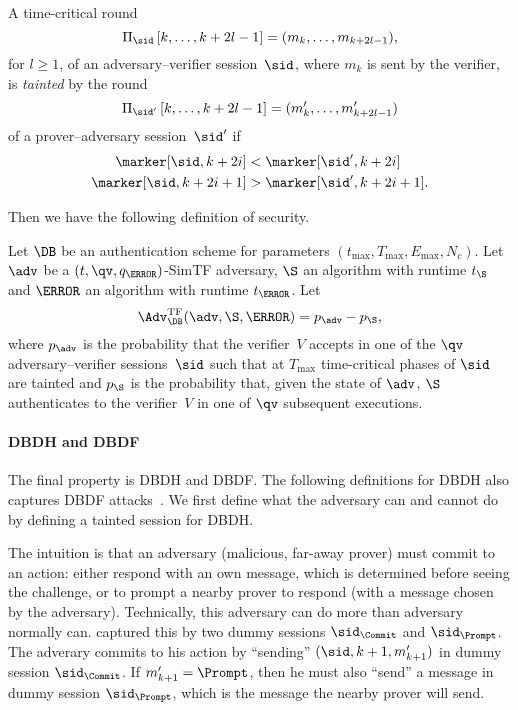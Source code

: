 \begin{definition}\label{TaintedTF}
  A time-critical round
  \[\Xscript{\sid}{k, \dotsc, k+2l-1} = (m_k, \dotsc, m_{k+2l-1}),\] for 
  \(l\geq 1\), of an adversary--verifier session~\(\sid\), where \(m_k\) is 
  sent by the verifier, is \emph{tainted} by the round
  \[\Xscript{\sid'}{k, \dotsc, k+2l-1} = (m'_{k}, \dotsc, m'_{k+2l-1})\]
  of a prover--adversary session~\(\sid'\) if
  \begin{align*}
    \marker[\sid, k+2i] &< \marker[\sid', k+2i] \\
    \marker[\sid, k+2i+1] &> \marker[\sid', k+2i+1].
  \end{align*}
\end{definition}

Then we have the following definition of security.

\begin{definition}%
  \label{TFresistance}
  Let \(\DB\) be an authentication scheme for parameters \((t_{\max}, T_{\max}, 
    E_{\max}, N_c)\).
  Let \(\adv\) be a \((t, \qv, q_{\F})\)-SimTF adversary, \(\S\) an algorithm 
  with runtime \(t_{\S}\) and \(\F\) an algorithm with runtime \(t_{\F}\).
  Let \[
    \Adv_{\DB}^{\text{TF}}(\adv, \S, \F) = p_{\adv} - p_{\S},
  \] where \(p_{\adv}\) is the probability that the verifier~\(V\) accepts in 
  one of the \(\qv\) adversary--verifier sessions~\(\sid\) such that at 
  \(T_{\max}\) time-critical phases of \(\sid\) are tainted and \(p_{\S}\) is 
  the probability that, given the state of \(\adv\), \(\S\) authenticates to 
  the verifier~\(V\) in one of \(\qv\) subsequent executions.
\end{definition}

\paragraph*{\Acl*{DBDH} and \acl*{DBDF}}

The final property is \ac{DBDH} and \ac{DBDF}.
The following definitions for \ac{DBDH} also captures \ac{DBDF} 
attacks~\cite{TREAD}.
We first define what the adversary can and cannot do by defining a tainted 
session for \ac{DBDH}.

The intuition is that an adversary (malicious, far-away prover) must commit to 
an action: either respond with an own message, which is determined before 
seeing the challenge, or to prompt a nearby prover to respond (with a message 
chosen by the adversary).
Technically, this adversary can do more than  adversary normally can.
\Textcite{TREAD} captured this by two dummy sessions \(\sid_{\Commit}\) and 
\(\sid_{\Prompt}\).
The adverary commits to his action by \enquote{sending} \((\sid, k+1, 
m'_{k+1})\) in dummy session \(\sid_{\Commit}\).
If \(m'_{k+1} = \Prompt\), then he must also \enquote{send} a message in dummy 
session \(\sid_{\Prompt}\), which is the message the nearby prover will send.

